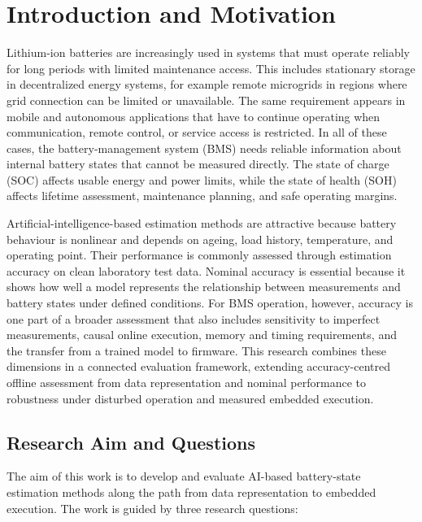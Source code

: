 \documentclass[
    a4paper,
    12pt,
    titlepage,
    bibliography=totoc,
    twoside=on,
    parskip=false,
    numbers=noenddot,
    cleardoublepage=empty,
    DIV=12,
    BCOR=12.0mm,
    headheight=36pt,
    headings=openright
]{scrreprt}
\newcommand{\chapterrole}[1]{}
\begin{document}
\listoffigures
{}
\listoftables
{}

\cleardoublepage
{}

\chapter{Introduction and Motivation}
\label{chap:introduction}
\chapterrole{}

Lithium-ion batteries are increasingly used in systems that must operate reliably for long periods with limited maintenance access. This includes stationary storage in decentralized energy systems, for example remote microgrids in regions where grid connection can be limited or unavailable. The same requirement appears in mobile and autonomous applications that have to continue operating when communication, remote control, or service access is restricted. In all of these cases, the battery-management system (BMS) needs reliable information about internal battery states that cannot be measured directly. The state of charge (SOC) affects usable energy and power limits, while the state of health (SOH) affects lifetime assessment, maintenance planning, and safe operating margins.

Artificial-intelligence-based estimation methods are attractive because battery behaviour is nonlinear and depends on ageing, load history, temperature, and operating point. Their performance is commonly assessed through estimation accuracy on clean laboratory test data. Nominal accuracy is essential because it shows how well a model represents the relationship between measurements and battery states under defined conditions. For BMS operation, however, accuracy is one part of a broader assessment that also includes sensitivity to imperfect measurements, causal online execution, memory and timing requirements, and the transfer from a trained model to firmware. This research combines these dimensions in a connected evaluation framework, extending accuracy-centred offline assessment from data representation and nominal performance to robustness under disturbed operation and measured embedded execution.

\section{Research Aim and Questions}
The aim of this work is to develop and evaluate AI-based battery-state estimation methods along the path from data representation to embedded execution. The work is guided by three research questions:
\end{document}
